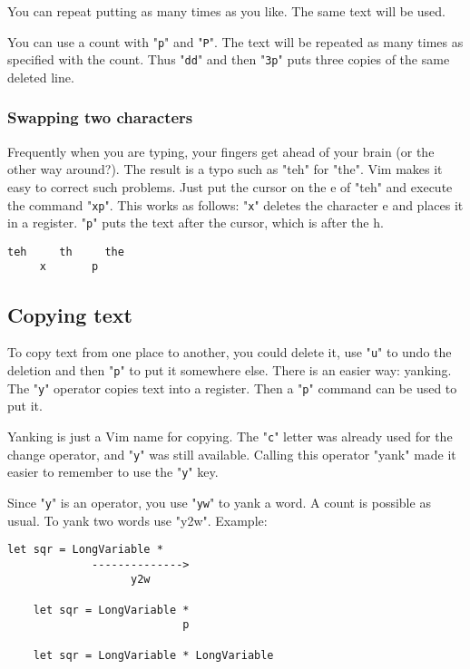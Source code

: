 You can repeat putting as many times as you like.
The same text will be used.

You can use a count with "\verb!p!" and "\verb!P!".
The text will be repeated as many times as specified with the count.
Thus "\verb!dd!" and then "\verb!3p!" puts three copies of the same deleted line.

\subsubsection{Swapping two characters}

Frequently when you are typing, your fingers get ahead of your brain (or the other way around?).
The result is a typo such as "teh" for "the".
Vim makes it easy to correct such problems.
Just put the cursor on the e of "teh" and execute the command "\verb!xp!".
This works as follows: "\verb!x!" deletes the character e and places it in a register.
"\verb!p!" puts the text after the cursor, which is after the h.

\begin{Verbatim}[samepage=true]
    teh     th     the 
     x       p
\end{Verbatim}

\subsection{Copying text}

To copy text from one place to another, you could delete it, use "\verb!u!" to undo the deletion and then "\verb!p!" to put it somewhere else.
There is an easier way: yanking.
The "\verb!y!" operator copies text into a register.
Then a "\verb!p!" command can be used to put it.

Yanking is just a Vim name for copying.
The "\verb!c!" letter was already used for the change operator, and "\verb!y!" was still available.
Calling this operator "yank" made it easier to remember to use the "\verb!y!" key.

Since "\verb!y!" is an operator, you use "\verb!yw!" to yank a word.
A count is possible as usual.
To yank two words use "y2w".
Example:

\begin{Verbatim}[samepage=true]
    let sqr = LongVariable * 
             -------------->
                   y2w

    let sqr = LongVariable * 
                           p

    let sqr = LongVariable * LongVariable 
\end{Verbatim}

